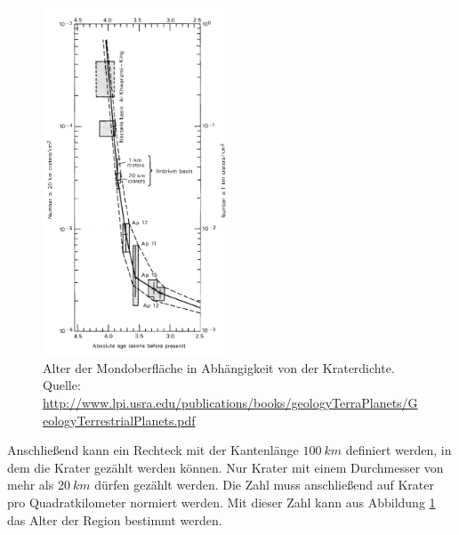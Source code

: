 \documentclass[10pt,a4paper,titlepage]{article}
\begin{document}
\begin{figure}[h!]
  \centering
    \includegraphics[width=0.5\textwidth]{Altersbestimmung_Mondoberflaeche}
  \caption{Alter der Mondoberfläche in Abhängigkeit von der Kraterdichte. Quelle: \url{http://www.lpi.usra.edu/publications/books/geologyTerraPlanets/GeologyTerrestrialPlanets.pdf}}
  \label{fig:crateringrate}
\end{figure}

Anschließend kann ein Rechteck mit der Kantenlänge $\SI{100}{km}$ definiert werden, in dem die Krater gezählt werden können. Nur Krater mit einem Durchmesser von mehr als $\SI{20}{km}$ dürfen gezählt werden. Die Zahl muss anschließend auf Krater pro Quadratkilometer normiert werden. Mit dieser Zahl kann aus Abbildung \ref{fig:crateringrate} das Alter der Region bestimmt werden.

{}

\end{document}
